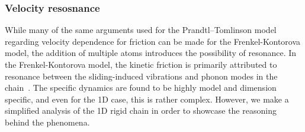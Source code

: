 





\subsubsection{Velocity resosnance} %

While many of the same arguments used for the Prandtl–Tomlinson model regarding velocity dependence for friction can be made for the Frenkel-Kontorova model, the addition of multiple atoms introduces the possibility of resonance. In the Frenkel-Kontorova model, the kinetic friction is primarily attributed to resonance between the sliding-induced vibrations and phonon modes in the chain~\cite{FK2D}. The specific dynamics are found to be highly model and dimension specific, and even for the 1D case, this is rather complex. However, we make a simplified analysis of the 1D rigid chain in order to showcase the reasoning behind the phenomena.

